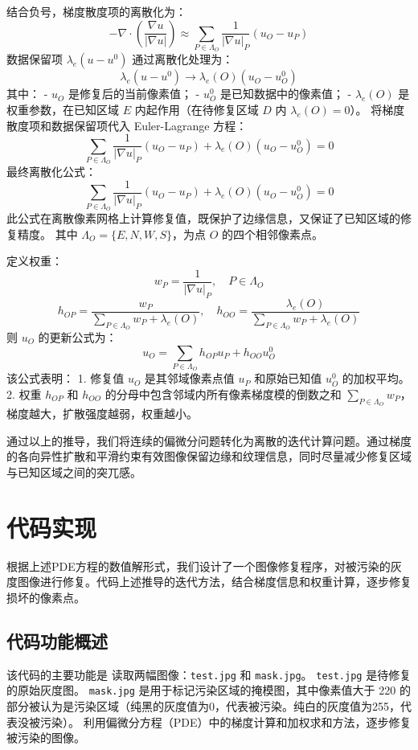 \documentclass[UTF8]{ctexart}
\begin{document}
结合负号，梯度散度项的离散化为：
\[
-\nabla \cdot \left( \frac{\nabla u}{|\nabla u|} \right) \approx \sum_{P \in \Lambda_O} \frac{1}{|\nabla u|_P}(u_O - u_P)
\]
数据保留项 $\lambda_e (u - u^0)$ 通过离散化处理为：
\[
\lambda_e (u - u^0) \to \lambda_e(O) (u_O - u^0_O)
\]
其中：
- $u_O$ 是修复后的当前像素值；
- $u^0_O$ 是已知数据中的像素值；
- $\lambda_e(O)$ 是权重参数，在已知区域 $E$ 内起作用（在待修复区域 $D$ 内 $\lambda_e(O) = 0$）。
将梯度散度项和数据保留项代入 Euler-Lagrange 方程：
\[
\sum_{P \in \Lambda_O} \frac{1}{|\nabla u|_P}(u_O - u_P) + \lambda_e(O)(u_O - u^0_O) = 0
\]
最终离散化公式：
\[
\sum_{P \in \Lambda_O} \frac{1}{|\nabla u|_P}(u_O - u_P) + \lambda_e(O)(u_O - u^0_O) = 0
\]
此公式在离散像素网格上计算修复值，既保护了边缘信息，又保证了已知区域的修复精度。
其中 $\Lambda_O = \{E, N, W, S\}$，为点 $O$ 的四个相邻像素点。

定义权重：
\[
w_P = \frac{1}{|\nabla u|_P}, \quad P \in \Lambda_O
\]
\[
h_{OP} = \frac{w_P}{\sum_{P \in \Lambda_O} w_P + \lambda_e(O)}, \quad h_{OO} = \frac{\lambda_e(O)}{\sum_{P \in \Lambda_O} w_P + \lambda_e(O)}
\]
则 $u_O$ 的更新公式为：
\[
u_O = \sum_{P \in \Lambda_O} h_{OP} u_P + h_{OO} u^0_O
\]
该公式表明：
1. 修复值 $u_O$ 是其邻域像素点值 $u_P$ 和原始已知值 $u^0_O$ 的加权平均。
2. 权重 $h_{OP}$ 和 $h_{OO}$ 的分母中包含邻域内所有像素梯度模的倒数之和 $\sum_{P \in \Lambda_O} w_P$，梯度越大，扩散强度越弱，权重越小。

通过以上的推导，我们将连续的偏微分问题转化为离散的迭代计算问题。通过梯度的各向异性扩散和平滑约束有效图像保留边缘和纹理信息，同时尽量减少修复区域与已知区域之间的突兀感。

\section{代码实现}

根据上述PDE方程的数值解形式，我们设计了一个图像修复程序，对被污染的灰度图像进行修复。代码上述推导的迭代方法，结合梯度信息和权重计算，逐步修复损坏的像素点。

\subsection{代码功能概述}
该代码的主要功能是
读取两幅图像：\texttt{test.jpg} 和 \texttt{mask.jpg}。
\texttt{test.jpg} 是待修复的原始灰度图。
\texttt{mask.jpg} 是用于标记污染区域的掩模图，其中像素值大于 220 的部分被认为是污染区域（纯黑的灰度值为0，代表被污染。纯白的灰度值为255，代表没被污染）。
利用偏微分方程（PDE）中的梯度计算和加权求和方法，逐步修复被污染的图像。
\end{document}

